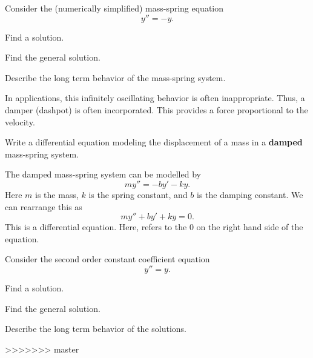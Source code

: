 \begin{applicationActivities}
\begin{activity}{15}
Consider the (numerically simplified) mass-spring equation \[y''=-y.\]
\begin{subactivity}
Find a solution.
\end{subactivity}
\begin{subactivity}
Find the general solution.
\end{subactivity}
\begin{subactivity}
Describe the long term behavior of the mass-spring system.
\end{subactivity}
\end{activity}

\begin{activity}{5}
In applications, this infinitely oscillating behavior is often inappropriate.
\vfill
Thus, a damper (dashpot) is often incorporated.  This provides a force proportional to the velocity.
\begin{center}
\springmassdamper
\end{center}
\vfill
Write a differential equation modeling the displacement of a mass in a \textbf{damped} mass-spring system.
\vfill
\end{activity}

\begin{observation}
The damped mass-spring system can be modelled by
\[my''=-by'-ky.\]
Here \(m\) is the mass, \(k\) is the spring constant, and \(b\) is the damping constant.  We can rearrange this as
\[my''+by'+ky=0.\]
\vfill
This is a   differential equation.
Here,  refers to the \(0\) on the right hand side of the equation.
\end{observation}

\begin{activity}{15}
Consider the second order constant coefficient equation \[y''=y.\]
\begin{subactivity}
Find a solution.
\end{subactivity}
\begin{subactivity}
Find the general solution.
\end{subactivity}
\begin{subactivity}
Describe the long term behavior of the solutions.
\end{subactivity}
\end{activity}
>>>>>>> master




\end{applicationActivities}
